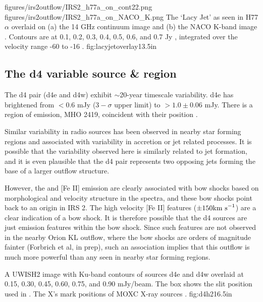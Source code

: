 \FigureTwo
{figures/irs2outflow/IRS2_h77a_on_cont22.png} %
{figures/irs2outflow/IRS2_h77a_on_NACO_K.png} %
{The `Lacy Jet' as seen in H77$\alpha$ overlaid on (a) the 14 GHz continuum
image and (b) the NACO K-band image \citep{Barbosa2008a}.  Contours are at 
0.1, 0.2, 0.3, 0.4, 0.5, 0.6, and 0.7 Jy \kms, integrated over the velocity
range -60 to -16 \kms.}
{fig:lacyjetoverlay}{1}{3.5in}

\subsection{The d4 variable source \& \hh region}
The d4 pair (d4e and d4w) exhibit $\sim$20-year timescale variability.  d4e has
brightened from $<0.6$ mJy ($3-\sigma$ upper limit) to $>1.0\pm0.06$ mJy.
There is a region of \hh emission, MHO 2419, coincident with their position
\citep[Figure \ref{fig:d4h2}][]{Hodapp2002a,Froebrich2011a}.

Similar variability in radio sources has been observed in nearby star forming
regions \citep{Liu2014c,Forbrich2013a} and associated with variability in
accretion or jet related processes.  It is possible that the variability
observed here is similarly related to jet formation, and it is even plausible
that the d4 pair represents two opposing jets forming the base of a larger
outflow structure.

However, the \hh and [Fe II] emission are clearly associated with bow shocks
based on morphological and velocity structure in the \citet{Hodapp2002a}
spectra, and these bow shocks point back to an origin in IRS 2.  The high
velocity [Fe II] features ($\pm150 \textrm{km~s}^{-1}$) are a clear indication of a bow
shock.  It is therefore possible that the d4 sources are just emission features
within the bow shock.  Since such features are not observed in the nearby Orion
KL outflow, where the bow shocks are orders of magnitude fainter (Forbrich et
al, in prep), such an association implies that this outflow is much more
powerful than any seen in nearby star forming regions.

{A UWISH2 \hh image with Ku-band contours of sources d4e and d4w overlaid at
0.15, 0.30, 0.45, 0.60, 0.75, and 0.90 mJy/beam.  The box shows the slit
position used in \citet{Hodapp2002a}.  The X's mark positions of MOXC X-ray
sources \citep{Townsley2014a}.
}
{fig:d4h2}{1}{6.5in}

